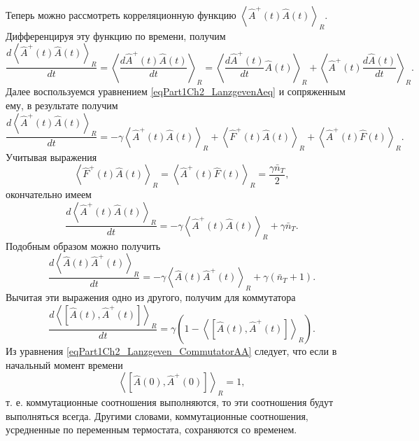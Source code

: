 Теперь можно рассмотреть корреляционную функцию 
\(
\left<\hat{A}^{+}\left(t\right)\hat{A}\left(t\right)\right>_R
\). Дифференцируя эту функцию по времени, получим
\begin{equation}
\frac{d \left<\hat{A}^{+}\left(t\right)\hat{A}\left(t\right)\right>_R}{d
t}=
\left<\frac{d \hat{A}^{+}\left(t\right)\hat{A}\left(t\right)}{d
t}\right>_R =
\left<\frac{d \hat{A}^{+}\left(t\right)}{d
t} \hat{A}\left(t\right) \right>_R + 
\left<\hat{A}^{+}\left(t\right)\frac{d \hat{A}\left(t\right)}{d
t}  \right>_R.
\label{eqPart1Ch2_Lanzgeven_dAA}
\end{equation}
Далее воспользуемся уравнением \eqref{eqPart1Ch2_LanzgevenAeq} и
сопряженным ему, в результате получим
\begin{equation}
\frac{d \left<\hat{A}^{+}\left(t\right)\hat{A}\left(t\right)\right>_R}{d
t}=
- \gamma \left<\hat{A}^{+}\left(t\right)\hat{A}\left(t\right)\right>_R
+ \left<\hat{F}^{+}\left(t\right)\hat{A}\left(t\right)\right>_R + 
\left<\hat{A}^{+}\left(t\right)\hat{F}\left(t\right)\right>_R.
\nonumber
\end{equation}
Учитывая выражения 
\begin{equation}
\left<\hat{F}^{+}\left(t\right)\hat{A}\left(t\right)\right>_R =
\left<\hat{A}^{+}\left(t\right)\hat{F}\left(t\right)\right>_R = 
\frac{\gamma \bar{n}_T}{2},
\nonumber
\end{equation}
окончательно имеем
\begin{equation}
\frac{d \left<\hat{A}^{+}\left(t\right)\hat{A}\left(t\right)\right>_R}{d
t}=
- \gamma \left<\hat{A}^{+}\left(t\right)\hat{A}\left(t\right)\right>_R
+ \gamma \bar{n}_T.
\nonumber
\end{equation}
Подобным образом можно получить
\begin{equation}
\frac{d \left<\hat{A}\left(t\right)\hat{A}^{+}\left(t\right)\right>_R}{d
t}=
- \gamma \left<\hat{A}\left(t\right)\hat{A}^{+}\left(t\right)\right>_R
+ \gamma \left(\bar{n}_T + 1\right).
\label{eqPart1Ch2_Lanzgeven_Task3}
\end{equation}
Вычитая эти выражения одно из другого, получим для коммутатора
\begin{equation}
\frac{d \left<\left[\hat{A}\left(t\right),\hat{A}^{+}\left(t\right)\right]\right>_R}{d
t}=
\gamma \left( 1 - \left<\left[\hat{A}\left(t\right),\hat{A}^{+}\left(t\right)\right]\right>_R
\right).
\label{eqPart1Ch2_Lanzgeven_CommutatorAA}
\end{equation}
Из уравнения \eqref{eqPart1Ch2_Lanzgeven_CommutatorAA} следует, что
если в начальный момент времени 
\[
\left<\left[\hat{A}\left(0\right),\hat{A}^{+}\left(0\right)\right]\right>_R
= 1,
\]
т. е. коммутационные соотношения выполняются, то эти соотношения будут
выполняться всегда. Другими словами, коммутационные соотношения,
усредненные по переменным термостата, сохраняются со временем. 

